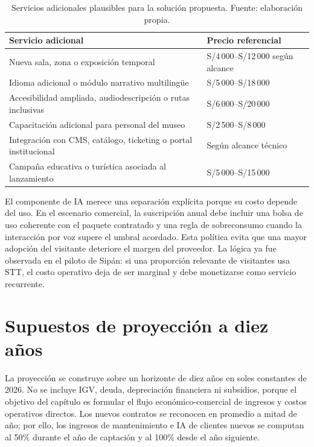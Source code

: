 \begin{table}[h!]
	\centering
	\footnotesize
	\setlength{\tabcolsep}{4pt}
	\begin{tabular}{>{\raggedright\arraybackslash}p{7.2cm} >{\raggedright\arraybackslash}p{5.2cm}}
		\hline
		\textbf{Servicio adicional} & \textbf{Precio referencial} \\
		\hline
		Nueva sala, zona o exposición temporal & S/4\,000--S/12\,000 según alcance \\
		Idioma adicional o módulo narrativo multilingüe & S/5\,000--S/18\,000 \\
		Accesibilidad ampliada, audiodescripción o rutas inclusivas & S/6\,000--S/20\,000 \\
		Capacitación adicional para personal del museo & S/2\,500--S/8\,000 \\
		Integración con CMS, catálogo, ticketing o portal institucional & Según alcance técnico \\
		Campaña educativa o turística asociada al lanzamiento & S/5\,000--S/15\,000 \\
		\hline
	\end{tabular}
	\caption[Servicios adicionales plausibles]{Servicios adicionales plausibles para la solución propuesta. Fuente: elaboración propia.}
	\label{tab:servicios-adicionales-museiq}
\end{table}

El componente de IA merece una separación explícita porque su costo depende del uso. En el escenario comercial, la suscripción anual debe incluir una bolsa de uso coherente con el paquete contratado y una regla de sobreconsumo cuando la interacción por voz supere el umbral acordado. Esta política evita que una mayor adopción del visitante deteriore el margen del proveedor. La lógica ya fue observada en el piloto de Sipán: si una proporción relevante de visitantes usa STT, el costo operativo deja de ser marginal y debe monetizarse como servicio recurrente.

\section{Supuestos de proyección a diez años}

La proyección se construye sobre un horizonte de diez años en soles constantes de 2026. No se incluye IGV, deuda, depreciación financiera ni subsidios, porque el objetivo del capítulo es formular el flujo económico-comercial de ingresos y costos operativos directos. Los nuevos contratos se reconocen en promedio a mitad de año; por ello, los ingresos de mantenimiento e IA de clientes nuevos se computan al 50\% durante el año de captación y al 100\% desde el año siguiente.

